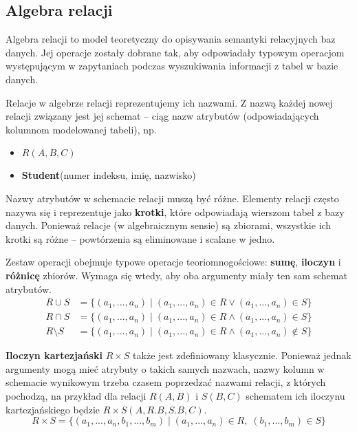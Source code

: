 \subsection{Algebra relacji}

Algebra relacji to model teoretyczny do opisywania semantyki relacyjnych baz danych. Jej operacje zostały dobrane tak, aby odpowiadały typowym operacjom występującym w zapytaniach podczas wyszukiwania informacji z tabel w bazie danych.

Relacje w algebrze relacji reprezentujemy ich nazwami. Z nazwą każdej nowej relacji związany jest jej schemat -- ciąg nazw atrybutów (odpowiadających kolumnom modelowanej tabeli), np.
\begin{itemize}
    \item $R(A, B, C)$
    \item \textbf{Student}(numer indeksu, imię, nazwisko)
\end{itemize}
Nazwy atrybutów w schemacie relacji muszą być różne. Elementy relacji często nazywa się i reprezentuje jako \textbf{krotki}, które odpowiadają wierszom tabel z bazy danych. Ponieważ relacje (w algebraicznym sensie) są zbiorami, wszystkie ich krotki są różne -- powtórzenia są eliminowane i scalane w jedno.

\bigskip

Zestaw operacji obejmuje typowe operacje teoriomnogościowe: \textbf{sumę}, \textbf{iloczyn} i \textbf{różnicę} zbiorów. Wymaga się wtedy, aby oba argumenty miały ten sam schemat atrybutów.
\begin{align*}
    R \cup S &= \{(a_1, ..., a_n) \; | \; (a_1, ..., a_n) \in R \lor (a_1, ..., a_n) \in S \} \\
    R \cap S &= \{(a_1, ..., a_n) \; | \; (a_1, ..., a_n) \in R \land (a_1, ..., a_n) \in S \} \\
    R \setminus S &= \{(a_1, ..., a_n) \; | \; (a_1, ..., a_n) \in R \land (a_1, ..., a_n) \notin S \}
\end{align*}

\textbf{Iloczyn kartezjański} $R \times S$ także jest zdefiniowany klasycznie. Ponieważ jednak argumenty mogą mieć atrybuty o takich samych nazwach, nazwy kolumn w schemacie wynikowym trzeba czasem poprzedzać nazwami relacji, z których pochodzą, na przykład dla relacji $R(A, B)$ i $S(B, C)$ schematem ich iloczynu kartezjańskiego będzie $R \times S(A, R.B, S.B, C)$.
$$R \times S = \{(a_1, ..., a_n, b_1, ..., b_m) \; | \; (a_1, ..., a_n) \in R, \; (b_1, ..., b_m) \in S \}$$

